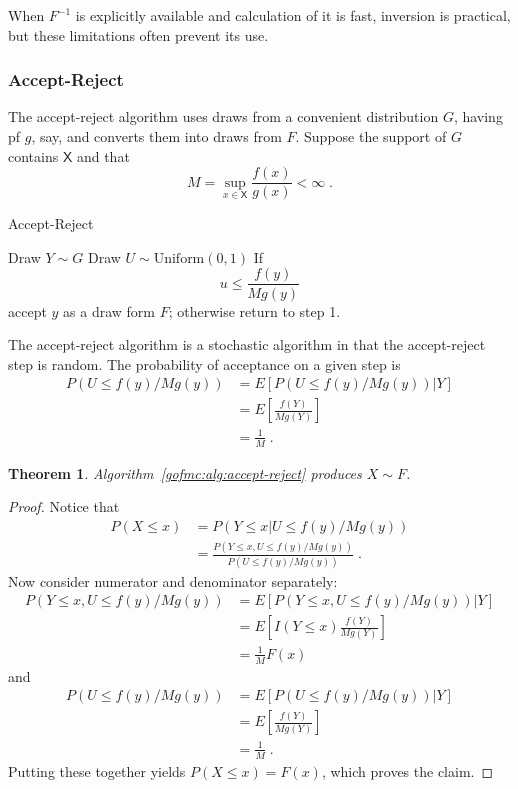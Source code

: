 \documentclass[12pt]{article}
\theoremstyle{plain}
\newtheorem{thm}{Theorem}[section]
\theoremstyle{definition}
\theoremstyle{remark}
\newcommand{\sX}{\mathsf{X}}
\begin{document}
When $F^{-1}$ is explicitly available and calculation of it is fast,
inversion is practical, but these limitations often prevent its use.

\subsubsection{Accept-Reject}
The accept-reject algorithm uses draws from a convenient distribution
$G$, having pf $g$, say, and converts them into draws from $F$.
Suppose the support of $G$ contains $\sX$ and that
\[
M = \sup_{x \in \sX} \frac{f(x)}{g(x)}< \infty \; .
\]

\begin{algorithm}[H]
 \caption{Accept-Reject} \label{gofmc:alg:accept-reject}
 \begin{algorithmic}[1]
 \State Draw $Y \sim G$
 \State Draw $U \sim \text{Uniform}(0,1)$
 \State If
 \[
u \le \frac{f(y)}{M g(y)}
 \]
accept $y$ as a draw form $F$; otherwise return to step 1.   
 \end{algorithmic}
\end{algorithm}

The accept-reject algorithm is a stochastic algorithm in that
the accept-reject step is random.  The probability of acceptance on a 
given step is
\begin{align*}
P( U \le f(y) / M g(y)) & = E \left[P( U \le f(y) / M g(y)) | Y \right]\\
& = E \left[ \frac{f(Y)}{Mg(Y)} \right]\\
& = \frac{1}{M} \; .
\end{align*}

\begin{thm} \label{gofmc:thm:accept-reject}
Algorithm~\ref{gofmc:alg:accept-reject} produces $X \sim F$.
\end{thm}

\begin{proof}
Notice that
\begin{align*}
P(X \le x) & = P(Y \le x | U \le f(y) / M g(y)) \\
& =  \frac{P(Y \le x,  U \le f(y) / M g(y))}{P( U \le f(y) / M g(y)) }
\; .
\end{align*}
Now consider numerator and denominator separately:
\begin{align*}
P(Y \le x,  U \le f(y) / M g(y)) &= E \left[ P(Y \le x,  U \le f(y) / M
  g(y)) | Y \right] \\
& = E \left[ I(Y \le x) \frac{f(Y)}{M g(Y)} \right] \\
& = \frac{1}{M} F(x)
\end{align*}
and
\begin{align*}
P( U \le f(y) / M g(y)) & = E \left[P( U \le f(y) / M g(y)) | Y \right]\\
& = E \left[ \frac{f(Y)}{Mg(Y)} \right]\\
& = \frac{1}{M} \; .
\end{align*}
Putting these together yields $P(X \le x) = F(x)$, which
proves the claim.
\end{proof}
\end{document}
